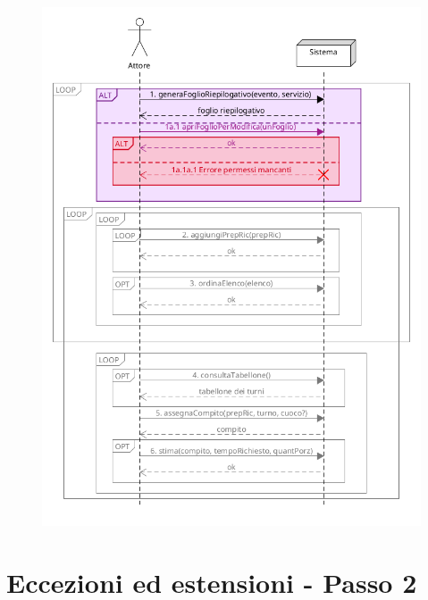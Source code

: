 \begin{figure}[h]
  \begin{center}
    \includegraphics[scale = 0.53]{images/SSD/SSD - passo 1.png}
  \end{center}
\end{figure}

\pagebreak

\section{Eccezioni ed estensioni - Passo 2}

